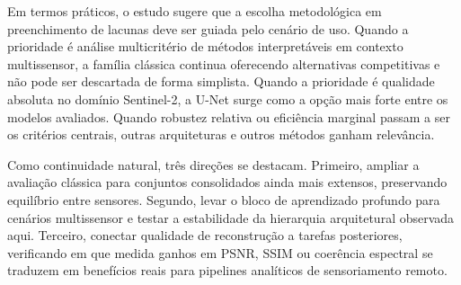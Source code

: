 Em termos práticos, o estudo sugere que a escolha metodológica em preenchimento de lacunas deve ser guiada pelo cenário de uso.
Quando a prioridade é análise multicritério de métodos interpretáveis em contexto multissensor, a família clássica continua oferecendo alternativas competitivas e não pode ser descartada de forma simplista.
Quando a prioridade é qualidade absoluta no domínio Sentinel-2, a U-Net surge como a opção mais forte entre os modelos avaliados.
Quando robustez relativa ou eficiência marginal passam a ser os critérios centrais, outras arquiteturas e outros métodos ganham relevância.

Como continuidade natural, três direções se destacam.
Primeiro, ampliar a avaliação clássica para conjuntos consolidados ainda mais extensos, preservando equilíbrio entre sensores.
Segundo, levar o bloco de aprendizado profundo para cenários multissensor e testar a estabilidade da hierarquia arquitetural observada aqui.
Terceiro, conectar qualidade de reconstrução a tarefas posteriores, verificando em que medida ganhos em \gls{PSNR}, \gls{SSIM} ou coerência espectral se traduzem em benefícios reais para pipelines analíticos de sensoriamento remoto.
